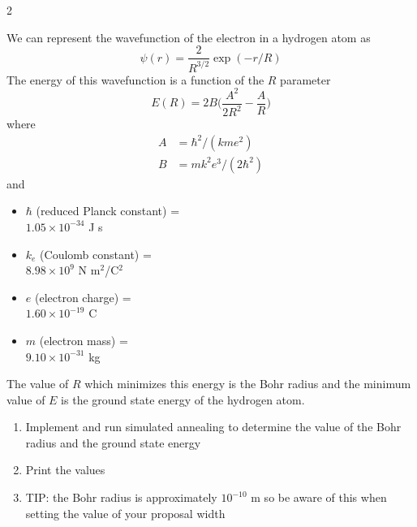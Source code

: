 \documentclass[12pt]{article}%
\begin{document}
\begin{multicols*}{2}
\begin{Exercise}[origin={25 points, Python}]
We can represent the wavefunction of the electron in a hydrogen atom as
\begin{equation*}
	\psi(r) = \dfrac{2}{R^{3/2}} \exp(-r/R)
\end{equation*}
The energy of this wavefunction is a function of the $R$ parameter
\begin{equation*}
	E(R) = 2B\bigg(\dfrac{A^2}{2R^2} - \dfrac{A}{R}\bigg)
\end{equation*}
where
\begin{align*}
	A & = \hbar^2/(k m e^2) \\
	B & = m k^2 e^3/(2\hbar^2)
\end{align*}
and
\begin{itemize}
	\item $\hbar$ (reduced Planck constant) = \\ $1.05\times10^{-34}$ J s
	\item $k_e$ (Coulomb constant) = \\ $8.98\times10^9$ N m$^2$/C$^2$
	\item $e$ (electron charge) = \\ $1.60\times10^{-19}$ C
	\item $m$ (electron mass) = \\ $9.10 \times 10^{-31}$ kg
\end{itemize}
The value of $R$ which minimizes this energy is the Bohr radius and the minimum value of $E$ is the ground state energy of the hydrogen atom.

\begin{enumerate}
	\item Implement and run simulated annealing to determine the value of the Bohr radius and the ground state energy
	\item Print the values
	\item TIP: the Bohr radius is approximately $10^{-10}$ m so be aware of this when setting the value of your proposal width
\end{enumerate}

\end{Exercise}








\end{multicols*}
\end{document}
